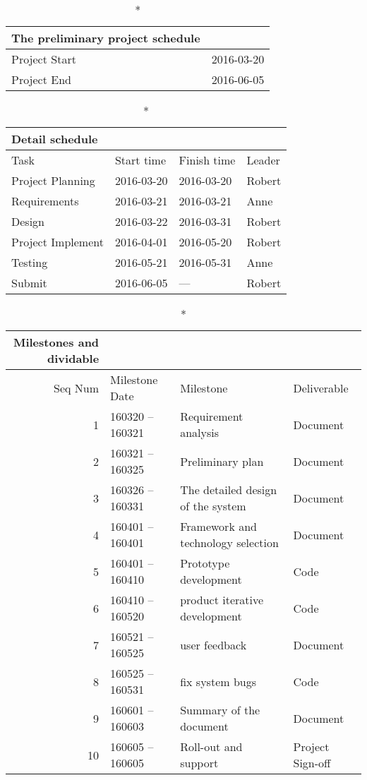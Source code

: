 \documentclass[a4paper,11pt]{article}
\begin{document}
\begin{center}
\begin{longtable}{|l|l|}
\caption*{The preliminary project schedule} \\
\hline Project Start   & 2016-03-20 \\
\hline Project End     & 2016-06-05 \\
\hline
\end{longtable}

\begin{longtable}{|l|l|l|l|}
\caption*{Detail schedule} \\
\hline Task              & Start time & Finish time & Leader \\
\hline Project Planning  & 2016-03-20 & 2016-03-20  & Robert \\
\hline Requirements      & 2016-03-21 & 2016-03-21  & Anne \\
\hline Design            & 2016-03-22 & 2016-03-31  & Robert \\
\hline Project Implement & 2016-04-01 & 2016-05-20  & Robert \\
\hline Testing           & 2016-05-21 & 2016-05-31  & Anne \\
\hline Submit            & 2016-06-05 & ---         & Robert \\
\hline
\end{longtable}

\begin{longtable}{|r|l|l|l|}
\caption*{Milestones and dividable} \\
\hline Seq Num & Milestone Date   & Milestone                          & Deliverable \\
\hline 1       & 160320 -- 160321 & Requirement analysis               & Document \\
\hline 2       & 160321 -- 160325 & Preliminary plan                   & Document \\
\hline 3       & 160326 -- 160331 & The detailed design of the system  & Document \\
\hline 4       & 160401 -- 160401 & Framework and technology selection & Document \\
\hline 5       & 160401 -- 160410 & Prototype development              & Code \\
\hline 6       & 160410 -- 160520 & product  iterative development     & Code \\
\hline 7       & 160521 -- 160525 & user feedback                      & Document \\
\hline 8       & 160525 -- 160531 & fix system bugs                    & Code \\
\hline 9       & 160601 -- 160603 & Summary of the document            & Document \\
\hline 10      & 160605 -- 160605 & Roll-out and support               & Project Sign-off \\
\hline 
\end{longtable}


\end{center}
\end{document}
